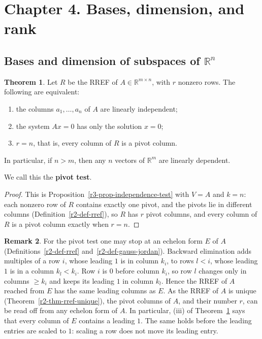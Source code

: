 \documentclass[12pt]{article}
\def\unitnumber{1}
\newcommand{\R}{\mathbb R}
\theoremstyle{definition}
\newtheorem{theorem}{Theorem}
\newtheorem{remark}[theorem]{Remark}
\begin{document}
\clearpage
\def\unitnumber{4}
\setcounter{theorem}{0}\setcounter{problem}{0}
\section*{Chapter 4. Bases, dimension, and rank}

\subsection*{Bases and dimension of subspaces of \(\R^n\)}

\begin{theorem}\label{thm:r4-pivot-test}
Let \(R\) be the RREF of \(A\in\R^{m\times n}\), with \(r\) nonzero rows. The following are
equivalent:
\begin{enumerate}[label=(\roman*)]
\item the columns \(a_1,\dots,a_n\) of \(A\) are linearly independent;
\item the system \(Ax=0\) has only the solution \(x=0\);
\item \(r=n\), that is, every column of \(R\) is a pivot column.
\end{enumerate}
In particular, if \(n>m\), then any \(n\) vectors of \(\R^m\) are linearly dependent.
\end{theorem}
We call this the \textbf{pivot test}.
\begin{proof}
This is Proposition~\ref{r3-prop-independence-test} with \(V=A\) and \(k=n\): each nonzero row of \(R\)
contains exactly one pivot, and the pivots lie in different columns (Definition~\ref{r2-def-rref}), so
\(R\) has \(r\) pivot columns, and every column of \(R\) is a pivot column exactly when \(r=n\).
\end{proof}

\begin{remark}\label{rem:r4-echelon}
For the pivot test one may stop at an echelon form \(E\) of \(A\) (Definitions~\ref{r2-def-rref}
and~\ref{r2-def-gauss-jordan}).
Backward elimination adds multiples of a row \(i\), whose leading \(1\) is in column \(k_i\), to rows
\(l<i\), whose leading \(1\) is in a column \(k_l<k_i\). Row \(i\) is \(0\) before column \(k_i\), so
row \(l\) changes only in columns \(\geqslant k_i\) and keeps its leading \(1\) in column \(k_l\).
Hence the RREF of \(A\) reached from \(E\) has the same leading columns as \(E\). As the RREF of \(A\)
is unique (Theorem~\ref{r2-thm-rref-unique}), the pivot columns of \(A\), and their
number \(r\), can be read off from any echelon form of \(A\). In particular,
(iii) of Theorem~\ref{thm:r4-pivot-test} says that every column of \(E\) contains a leading \(1\).
The same holds before the leading entries are scaled to \(1\): scaling a row does not move its
leading entry.
\end{remark}
\end{document}
